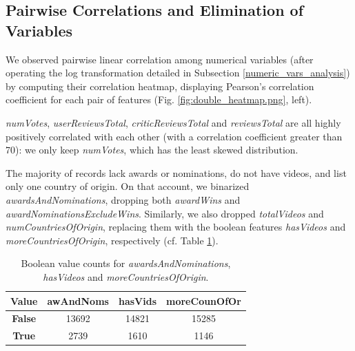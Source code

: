 \subsection{Pairwise Correlations and Elimination of Variables}
\label{var_correlation_elimination}
We observed pairwise linear correlation among numerical variables (after operating the log transformation detailed in Subsection \ref{numeric_vars_analysis}) by computing their correlation heatmap, displaying Pearson’s correlation coefficient for each pair of features (Fig. \ref{fig:double_heatmap.png}, left).



\textit{numVotes}, \textit{userReviewsTotal}, \textit{criticReviewsTotal} and \textit{reviewsTotal} are all highly positively correlated with each other (with a correlation coefficient greater than 70): we only keep \textit{numVotes}, which has the least skewed distribution.

The majority of records lack awards or nominations, do not have videos, and list only one country of origin. On that account, we binarized \textit{awardsAndNominations}, dropping both \textit{awardWins} and \textit{awardNominationsExcludeWins}. Similarly, we also dropped \textit{totalVideos} and \textit{numCountriesOfOrigin}, replacing them with the boolean features \textit{hasVideos} and \textit{moreCountriesOfOrigin}, respectively (cf. Table \ref{tab:binarized_vars}).
\begin{table}
    \centering
    \small
    \setlength{\tabcolsep}{4pt}
    \renewcommand{\arraystretch}{1}
    \begin{tabular}{cccc}
        \toprule
        \textbf{Value} & \textbf{awAndNoms} & \textbf{hasVids} & \textbf{moreCounOfOr} \\ \midrule
        \textbf{False} & 13692 & 14821 & 15285 \\
        \textbf{True}  & 2739  & 1610  & 1146  \\
        \bottomrule
    \end{tabular}
    \caption{Boolean value counts for \textit{awardsAndNominations}, \textit{hasVideos} and \textit{moreCountriesOfOrigin}.}
    \label{tab:binarized_vars}
\end{table}

